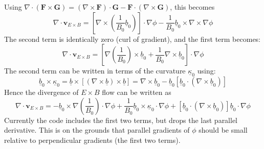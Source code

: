 \documentclass[12pt]{article}
\newcommand{\Vec}[1]{\ensuremath{\mathbf{#1}}}
\newcommand{\bvec}{\ensuremath{\underline{b}}}
\newcommand{\kvec}{\ensuremath{\underline{\kappa}}}
\begin{document}
Using $\nabla\cdot\left(\Vec{F}\times\Vec{G}\right) = \left(\nabla\times\Vec{F}\right)\cdot\Vec{G} - \Vec{F}\cdot\left(\nabla\times\Vec{G}\right)$, this becomes
\[
\nabla\cdot\Vec{v}_{E\times B} = \left[\nabla\times\left(\frac{1}{B_0}\bvec_0\right)\right]\cdot\nabla\phi - \frac{1}{B_0}\bvec_0\times\nabla\times\nabla\phi
\]
The second term is identically zero (curl of gradient), and the first term becomes:
\[
\nabla\cdot\Vec{v}_{E\times B} = \left[\nabla\left(\frac{1}{B_0}\right)\times\bvec_0 + \frac{1}{B_0}\nabla\times\bvec_0\right]\cdot\nabla\phi
\]
The second term can be written in terms of the curvature $\kvec_0$ using:
\[
\bvec_0\times\kvec_0 = \bvec\times\left[\left(\nabla\times\bvec\right)\times\bvec\right] = \nabla\times\bvec_0 - \bvec_0\left[\bvec_0\cdot\left(\nabla\times\bvec_0\right)\right]
\]
Hence the divergence of $E\times B$ flow can be written as
\[
\nabla\cdot\Vec{v}_{E\times B} = -\bvec_0\times\nabla\left(\frac{1}{B_0}\right)\cdot\nabla\phi + \frac{1}{B_0}\bvec_0\times\kvec_0\cdot\nabla\phi + \left[\bvec_0\cdot\left(\nabla\times\bvec_0\right)\right]\bvec_0\cdot\nabla\phi
\]
Currently the code includes the first two terms, but drops the last parallel
derivative. This is on the grounds that parallel gradients of $\phi$ should
be small relative to perpendicular gradients (the first two terms).
\end{document}
